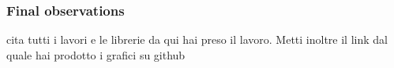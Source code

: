 \subsubsection{Final observations}

cita tutti i lavori e le librerie da qui hai preso il lavoro.
Metti inoltre il link dal quale hai prodotto i grafici su github